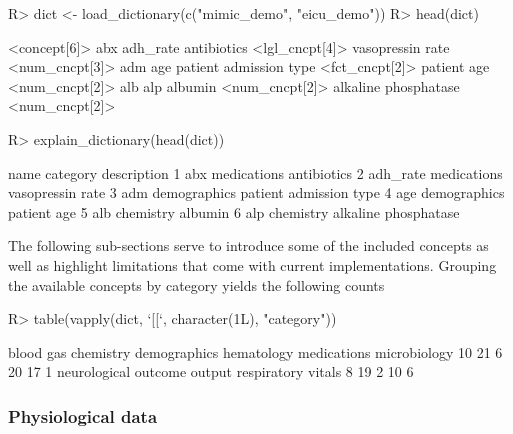 \documentclass[
  notitle]{jss}
\begin{document}
\begin{CodeChunk}
\begin{CodeInput}
R> dict <- load_dictionary(c("mimic_demo", "eicu_demo"))
R> head(dict)
\end{CodeInput}
\begin{CodeOutput}
<concept[6]>
                                  abx                              adh_rate 
           antibiotics <lgl_cncpt[4]>       vasopressin rate <num_cncpt[3]> 
                                  adm                                   age 
patient admission type <fct_cncpt[2]>            patient age <num_cncpt[2]> 
                                  alb                                   alp 
               albumin <num_cncpt[2]>   alkaline phosphatase <num_cncpt[2]> 
\end{CodeOutput}
\begin{CodeInput}
R> explain_dictionary(head(dict))
\end{CodeInput}
\begin{CodeOutput}
      name     category            description
1      abx  medications            antibiotics
2 adh_rate  medications       vasopressin rate
3      adm demographics patient admission type
4      age demographics            patient age
5      alb    chemistry                albumin
6      alp    chemistry   alkaline phosphatase
\end{CodeOutput}
\end{CodeChunk}

The following sub-sections serve to introduce some of the included
concepts as well as highlight limitations that come with current
implementations. Grouping the available concepts by category yields the
following counts

\begin{CodeChunk}
\begin{CodeInput}
R> table(vapply(dict, `[[`, character(1L), "category"))
\end{CodeInput}
\begin{CodeOutput}

   blood gas    chemistry demographics   hematology  medications microbiology 
          10           21            6           20           17            1 
neurological      outcome       output  respiratory       vitals 
           8           19            2           10            6 
\end{CodeOutput}
\end{CodeChunk}

\hypertarget{physiological-data}{%
\subsubsection{Physiological data}\label{physiological-data}}
\end{document}
